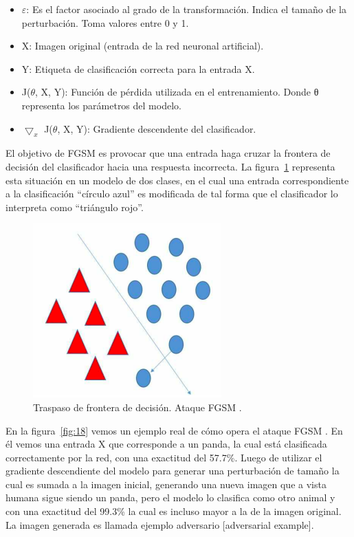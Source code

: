 \begin{itemize}
    \item $\varepsilon$: Es el factor asociado al grado de la transformación. Indica el tamaño de la perturbación. Toma valores entre 0 y 1.
    \item X: Imagen original (entrada de la red neuronal artificial).
    \item Y: Etiqueta de clasificación correcta para la entrada X.
    \item J($\theta$, X, Y): Función de pérdida utilizada en el entrenamiento. Donde θ representa los parámetros del modelo. 
    \item $\bigtriangledown_x$ J($\theta$, X, Y): Gradiente descendente del clasificador.
\end{itemize}

El objetivo de FGSM es provocar que una entrada haga cruzar la frontera de decisión del clasificador hacia una respuesta incorrecta. La figura~\ref{fig:17} representa esta situación en un modelo de dos clases, en el cual una entrada correspondiente a la clasificación “círculo azul” es modificada de tal forma que el clasificador lo interpreta como “triángulo rojo”.

\begin{figure}[th]
\centering
\includegraphics [scale = 0.95] {Figures/figura_17.PNG}
\decoRule
\caption[frontera de decisión]{Traspaso de frontera de decisión. Ataque FGSM \parencite{r4}.}
\label{fig:17}
\end{figure}

En la figura~\ref{fig:18} vemos un ejemplo real de cómo opera el ataque FGSM \parencite{r3}. En él vemos una entrada X que corresponde a un panda, la cual está clasificada correctamente por la red, con una exactitud del 57.7\%. Luego de utilizar el gradiente descendiente del modelo para generar una perturbación de tamaño  la cual es sumada a la imagen inicial, generando una nueva imagen que a vista humana sigue siendo un panda, pero el modelo lo clasifica como otro animal y con una exactitud del 99.3\% la cual es incluso mayor a la de la imagen original. La imagen generada es llamada ejemplo adversario [adversarial example].

